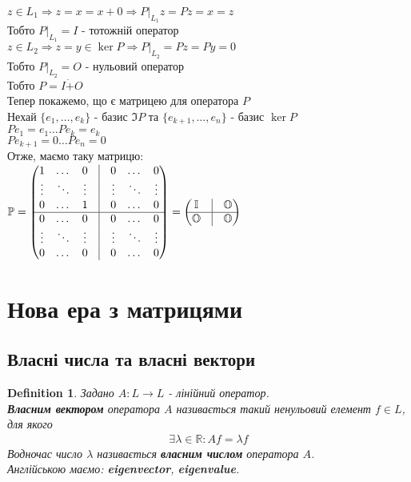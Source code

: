 \documentclass[a4paper, 10pt]{article}
\theoremstyle{theoremdd}
\newtheorem{definition}[theorem]{Definition}
\begin{document}
$z \in L_1 \Rightarrow z = x = x+0 \Rightarrow P|_{L_1}z = Pz = x = z$\\
Тобто $P|_{L_1} = I$ - тотожній оператор\\
$z \in L_2 \Rightarrow z = y \in \ker P \Rightarrow P|_{L_2} = Pz = Py = 0$\\
Тобто $P|_{L_2} = O$ - нульовий оператор\\
Тобто $P = I \dot{+} O$
\bigskip \\
Тепер покажемо, що є матрицею для оператора $P$\\
Нехай $\{e_1,\dots,e_k\}$ - базис $\Im P$ та $\{e_{k+1},\dots,e_n\}$ - базис $\ker P$\\
$Pe_1 = e_1 \dots Pe_k = e_k$\\
$Pe_{k+1} = 0 \dots Pe_n = 0$\\
Отже, маємо таку матрицю:\\
$\mathbb{P} = \begin{pmatrix}
1 & \dots & 0 & \vline & 0 & \dots & 0 \\
\vdots & \ddots & \vdots & \vline & \vdots & \ddots & \vdots \\
0 & \dots & 1 & \vline & 0 & \dots & 0 \\
\hline
0 & \dots & 0 & \vline & 0 & \dots & 0 \\
\vdots & \ddots & \vdots & \vline & \vdots & \ddots & \vdots \\
0 & \dots & 0 & \vline & 0 & \dots & 0 \\
\end{pmatrix} = \begin{pmatrix}
\mathbb{I}  & \vline & \mathbb{O} \\
 \hline
\mathbb{O} & \vline & \mathbb{O}
\end{pmatrix}$
\fi

\newpage
\setcounter{section}{3}
\setcounter{subsection}{0}
\section{Нова ера з матрицями}
\subsection{Власні числа та власні вектори}
\begin{definition}
Задано $A \colon L \to L$ - лінійний оператор.\\
\textbf{Власним вектором} оператора $A$ називається такий ненульовий елемент $f \in L$, для якого
\begin{align*}
\exists \lambda \in \mathbb{R}: Af = \lambda f
\end{align*}
Водночас число $\lambda$ називається \textbf{власним числом} оператора $A$.\\
Англійською маємо: \textbf{eigenvector}, \textbf{eigenvalue}.
\end{definition}
\end{document}
